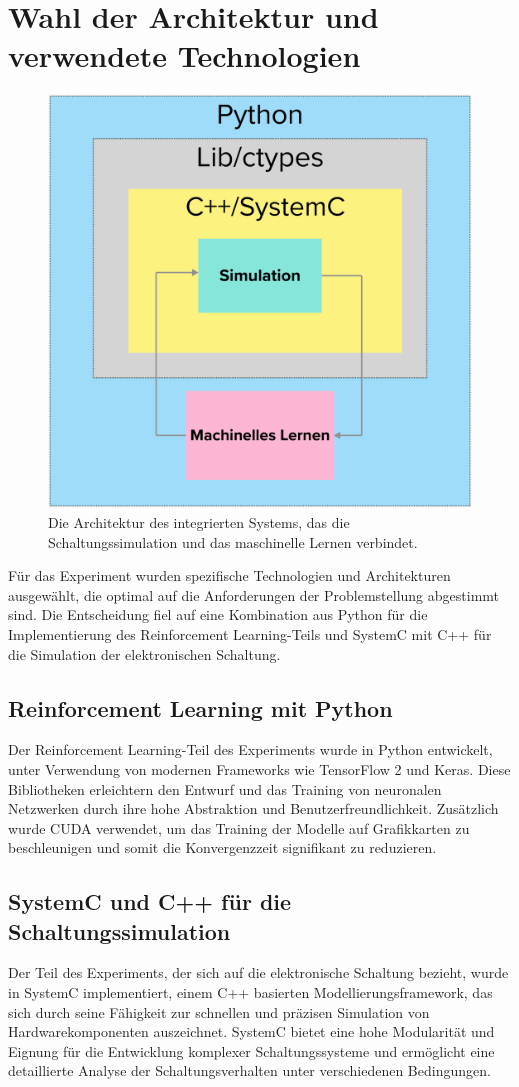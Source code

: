 \section{Wahl der Architektur und verwendete Technologien}
\label{sec:integration_rl_simulation}

\begin{figure}[htbp]
\centering
\includegraphics[width=0.4\linewidth]{3Experiment/1SystemC_Wahl_Architectur.png}
\caption{Die Architektur des integrierten Systems, das die Schaltungssimulation und das maschinelle Lernen verbindet.}
\label{fig:integrated_system_architecture}
\end{figure}

Für das Experiment wurden spezifische Technologien und Architekturen ausgewählt, die optimal auf die Anforderungen der Problemstellung abgestimmt sind. Die Entscheidung fiel auf eine Kombination aus Python für die Implementierung des Reinforcement Learning-Teils und SystemC mit C++ für die Simulation der elektronischen Schaltung.

\subsection{Reinforcement Learning mit Python}
Der Reinforcement Learning-Teil des Experiments wurde in Python entwickelt, unter Verwendung von modernen Frameworks wie TensorFlow 2 und Keras. Diese Bibliotheken erleichtern den Entwurf und das Training von neuronalen Netzwerken durch ihre hohe Abstraktion und Benutzerfreundlichkeit. Zusätzlich wurde CUDA verwendet, um das Training der Modelle auf Grafikkarten zu beschleunigen und somit die Konvergenzzeit signifikant zu reduzieren.

\subsection{SystemC und C++ für die Schaltungssimulation}
Der Teil des Experiments, der sich auf die elektronische Schaltung bezieht, wurde in SystemC implementiert, einem C++ basierten Modellierungsframework, das sich durch seine Fähigkeit zur schnellen und präzisen Simulation von Hardwarekomponenten auszeichnet. SystemC bietet eine hohe Modularität und Eignung für die Entwicklung komplexer Schaltungssysteme und ermöglicht eine detaillierte Analyse der Schaltungsverhalten unter verschiedenen Bedingungen.


